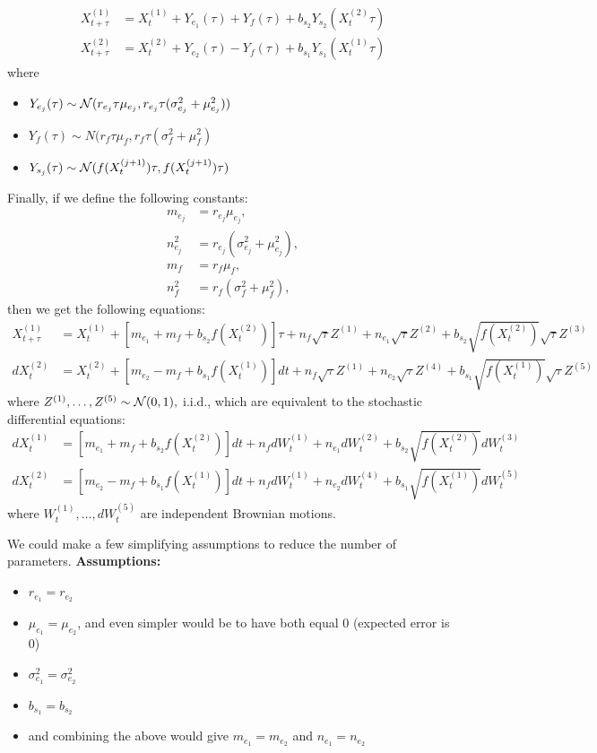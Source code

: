 \documentclass{article}
\begin{document}
\begin{align*}
X_{t+\tau}^{(1)}&=X_t^{(1)}+Y_{e_1}(\tau)+Y_f(\tau)+b_{s_2}Y_{s_2}(X_t^{(2)}\tau)
\\ X_{t+\tau}^{(2)}&=X_t^{(2)}+Y_{e_2}(\tau)-Y_f(\tau)+b_{s_1}Y_{s_1}(X_t^{(1)}\tau)
\end{align*}
where 
\begin{itemize}
\item $Y_{e_j}(\tau)\sim{\mathcal{ N}}(r_{e_j}\tau\mu_{e_j},r_{e_j}\tau(\sigma_{e_j}^2+\mu_{e_j}^2))$

\item $Y_f(\tau)\sim N(r_f\tau\mu_f,r_f\tau(\sigma^2_f+\mu_f^2)$

\item $Y_{s_j}(\tau)\sim{\mathcal{ N}}(f(X_t^{(j+1)})\tau,f(X_t^{(j+1)})\tau)$

\end{itemize}
Finally, if we define the following constants:
\begin{align*}
m_{e_j}&=r_{e_j}\mu_{e_j},
\\ n_{e_j}^2&=r_{e_j}(\sigma_{e_j}^2+\mu_{e_j}^2),
\\ m_f&=r_f\mu_f,
\\ n_f^2&=r_f(\sigma_f^2+\mu_f^2),
\end{align*}
then we get the following equations:
\begin{align*}
X_{t+\tau}^{(1)}&=X_t^{(1)}+\left[m_{e_1}+m_f+b_{s_2}f(X_t^{(2)})\right]\tau+n_f\sqrt{\tau}Z^{(1)}+n_{e_1}\sqrt{\tau}Z^{(2)}+b_{s_2}\sqrt{f(X_t^{(2)})}\sqrt{\tau}Z^{(3)}
\\ dX_t^{(2)}&=X_t^{(2)}+\left[m_{e_2}-m_f+b_{s_1}f(X_t^{(1)})\right]dt+n_f\sqrt{\tau}Z^{(1)}+n_{e_2}\sqrt{\tau}Z^{(4)}+b_{s_1}\sqrt{f(X_t^{(1)})}\sqrt{\tau}Z^{(5)}
\end{align*}
where $Z^{(1)},\dots,Z^{(5)}\sim {\mathcal{ N}}(0,1),$ i.i.d., which are equivalent to the stochastic differential equations:
\begin{align*}
dX_t^{(1)}&=\left[m_{e_1}+m_f+b_{s_2}f(X_t^{(2)})\right]dt+n_fdW_t^{(1)}+n_{e_1}dW_t^{(2)}+b_{s_2}\sqrt{f(X_t^{(2)})}dW_t^{(3)}
\\ dX_t^{(2)}&=\left[m_{e_2}-m_f+b_{s_1}f(X_t^{(1)})\right]dt+n_fdW_t^{(1)}+n_{e_2}dW_t^{(4)}+b_{s_1}\sqrt{f(X_t^{(1)})}dW_t^{(5)}
\end{align*}
where $W_t^{(1)},\dots,dW_t^{(5)}$ are independent Brownian motions.

We could make a few simplifying assumptions to reduce the number of parameters.  {\bf Assumptions:}
\begin{itemize}
\item $r_{e_1}=r_{e_2}$
\item $\mu_{e_1}=\mu_{e_2}$, and even simpler would be to have both equal $0$ (expected error is $0$)
\item $\sigma^2_{e_1}=\sigma^2_{e_2}$
\item $b_{s_1}=b_{s_2}$ 
\item and combining the above would give $m_{e_1}=m_{e_2}$ and $n_{e_1}=n_{e_2}$
\end{itemize}
\end{document}
